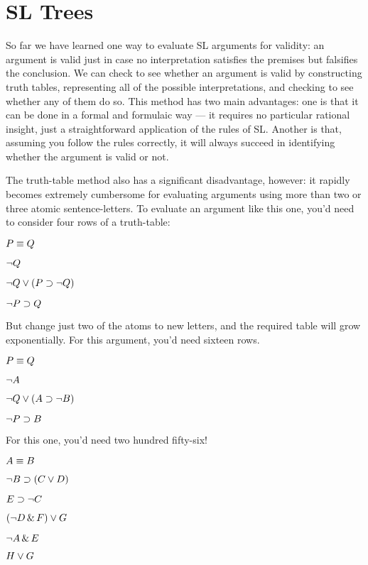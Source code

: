 \chapter{SL Trees}
\label{ch.sl.trees}

So far we have learned one way to evaluate SL arguments for validity: an argument is valid just in case no interpretation satisfies the premises but falsifies the conclusion. We can check to see whether an argument is valid by constructing truth tables, representing all of the possible interpretations, and checking to see whether any of them do so. This method has two main advantages: one is that it can be done in a formal and formulaic way  --- it requires no particular rational insight, just a straightforward application of the rules of SL. Another is that, assuming you follow the rules correctly, it will always succeed in identifying whether the argument is valid or not.

The truth-table method also has a significant disadvantage, however: it rapidly becomes extremely cumbersome for evaluating arguments using more than two or three atomic sentence-letters. To evaluate an argument like this one, you'd need to consider four rows of a truth-table:

\begin{earg}
\item[] $P\equiv Q$
\item[] $\neg Q$
\item[] $\neg Q \vee (P \supset \neg Q)$
\item[\therefore] $\neg P \supset Q$
\end{earg}

But change just two of the atoms to new letters, and the required table will grow exponentially. For this argument, you'd need sixteen rows.

\begin{earg}
\item[] $P\equiv Q$
\item[] $\neg A$
\item[] $\neg Q \vee (A \supset \neg B)$
\item[\therefore] $\neg P \supset B$
\end{earg}

For this one, you'd need two hundred fifty-six!
\label{8letterargument}
\begin{earg}
\item[] $A\equiv B$
\item[] $\neg B \supset (C \vee D)$
\item[] $E \supset \neg C$
\item[] $(\neg D \,\&\, F) \vee G$
\item[] $\neg A \,\&\, E$
\item[\therefore] $H \vee G$
\end{earg}

